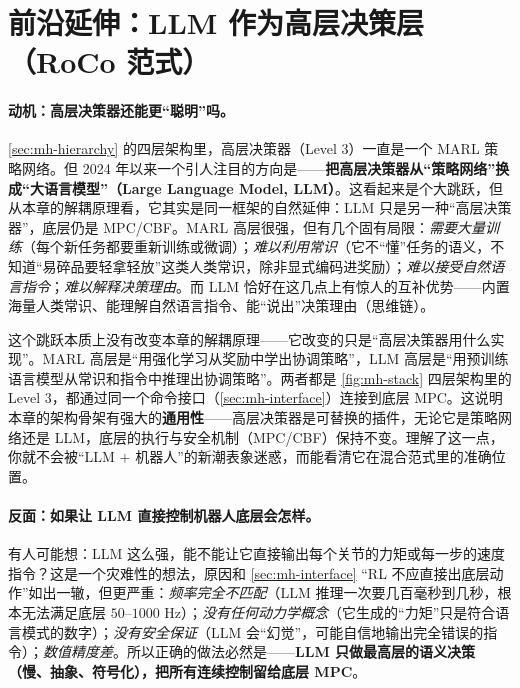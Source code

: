 \section{前沿延伸：LLM 作为高层决策层（RoCo 范式）}
\label{sec:mh-llm}

\paragraph{动机：高层决策器还能更“聪明”吗。}
\cref{sec:mh-hierarchy} 的四层架构里，高层决策器（Level 3）一直是一个 MARL 策略网络。但 2024 年以来一个引人注目的方向是——\textbf{把高层决策器从“策略网络”换成“大语言模型”（Large Language Model, LLM）}。这看起来是个大跳跃，但从本章的解耦原理看，它其实是同一框架的自然延伸：LLM 只是另一种“高层决策器”，底层仍是 MPC/CBF。MARL 高层很强，但有几个固有局限：\emph{需要大量训练}（每个新任务都要重新训练或微调）；\emph{难以利用常识}（它不“懂”任务的语义，不知道“易碎品要轻拿轻放”这类人类常识，除非显式编码进奖励）；\emph{难以接受自然语言指令}；\emph{难以解释决策理由}。而 LLM 恰好在这几点上有惊人的互补优势——内置海量人类常识、能理解自然语言指令、能“说出”决策理由（思维链）。

\begin{insight}
这个跳跃本质上没有改变本章的解耦原理——它改变的只是“高层决策器用什么实现”。MARL 高层是“用强化学习从奖励中学出协调策略”，LLM 高层是“用预训练语言模型从常识和指令中推理出协调策略”。两者都是 \cref{fig:mh-stack} 四层架构里的 Level 3，都通过同一个命令接口（\cref{sec:mh-interface}）连接到底层 MPC。这说明本章的架构骨架有强大的\textbf{通用性}——高层决策器是可替换的插件，无论它是策略网络还是 LLM，底层的执行与安全机制（MPC/CBF）保持不变。理解了这一点，你就不会被“LLM $+$ 机器人”的新潮表象迷惑，而能看清它在混合范式里的准确位置。
\end{insight}

\paragraph{反面：如果让 LLM 直接控制机器人底层会怎样。}
有人可能想：LLM 这么强，能不能让它直接输出每个关节的力矩或每一步的速度指令？这是一个灾难性的想法，原因和 \cref{sec:mh-interface} “RL 不应直接出底层动作”如出一辙，但更严重：\emph{频率完全不匹配}（LLM 推理一次要几百毫秒到几秒，根本无法满足底层 $50$--$1000$ Hz）；\emph{没有任何动力学概念}（它生成的“力矩”只是符合语言模式的数字）；\emph{没有安全保证}（LLM 会“幻觉”，可能自信地输出完全错误的指令）；\emph{数值精度差}。所以正确的做法必然是——\textbf{LLM 只做最高层的语义决策（慢、抽象、符号化），把所有连续控制留给底层 MPC}。

